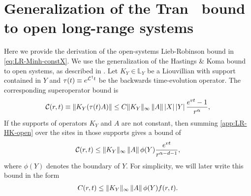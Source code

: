 \section{Generalization of the Tran \etal~bound to open long-range systems}
\label{sec:minh-bound-proof}
Here we provide the derivation of the open-systems Lieb-Robinson bound in \cref{eq:LR-Minh-constX}.
We use the generalization of the Hastings \& Koma bound to open systems, as described in \cite{Sweke2019}.
Let $K_Y\in \mathbb{L}_Y$ be a Liouvillian with support contained in $Y$ and $\tau(t) \equiv  e^{\mathcal{L}^\dagger t}$ be the backwards time-evolution operator.
The corresponding superoperator bound is
\begin{align}
  \mathcal C(r,t) \equiv \left\|  K_Y(\tau(t) A)\right\| \leq C \|K_Y\|_{\infty} \left\|A\right\|  \left | X \right|\left | Y \right|
    \frac{e^{vt}-1}{r^{\alpha}},
    \label{app:LR-HK-open}
\end{align}
If the supports of operators $K_Y$ and $A$ are not constant, then summing \cref{app:LR-HK-open} over the sites in those supports gives a bound of
\begin{align}
  \mathcal C(r,t) \le \|K_Y\|_{\infty} \left\|A\right\|
    \phi(Y)\frac{e^{vt}}{r^{\alpha-d-1}},
    \label{eq:LR-ZX-open-many-site}
\end{align}
 where $\phi(Y)$ denotes the boundary of $Y$. For simplicity, we will later write this bound in the form
\begin{align}
  C(r,t)\le \|K_Y\|_{\infty}\left\|A\right\|\phi(Y)f(r,t).
  \label{eq:eq:LR-HK-open}
\end{align}

